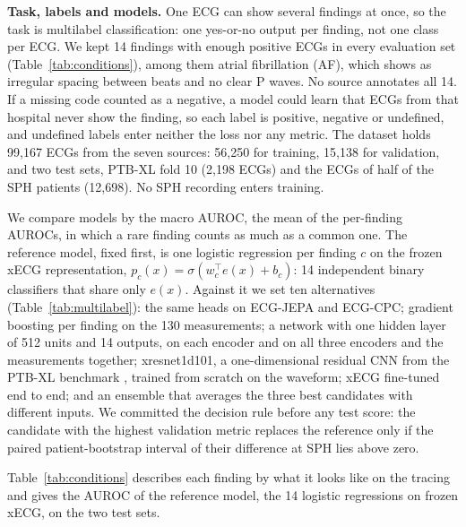 \documentclass[letterpaper,11pt]{article}
\begin{document}
\textbf{Task, labels and models.} One ECG can show several findings at once, so the task is multilabel classification: one yes-or-no output per finding, not one class per ECG. We kept 14 findings with enough positive ECGs in every evaluation set (Table~\ref{tab:conditions}), among them atrial fibrillation (AF), which shows as irregular spacing between beats and no clear P waves. No source annotates all 14. If a missing code counted as a negative, a model could learn that ECGs from that hospital never show the finding, so each label is positive, negative or undefined, and undefined labels enter neither the loss nor any metric. The dataset holds 99,167 ECGs from the seven sources: 56,250 for training, 15,138 for validation, and two test sets, PTB-XL fold 10 (2,198 ECGs) and the ECGs of half of the SPH patients (12,698). No SPH recording enters training.

We compare models by the macro AUROC, the mean of the per-finding AUROCs, in which a rare finding counts as much as a common one. The reference model, fixed first, is one logistic regression per finding $c$ on the frozen xECG representation, $p_c(x) = \sigma(w_c^{\top} e(x) + b_c)$: 14 independent binary classifiers that share only $e(x)$. Against it we set ten alternatives (Table~\ref{tab:multilabel}): the same heads on ECG-JEPA and ECG-CPC; gradient boosting per finding on the 130 measurements; a network with one hidden layer of 512 units and 14 outputs, on each encoder and on all three encoders and the measurements together; xresnet1d101, a one-dimensional residual CNN from the PTB-XL benchmark \parencite{strodthoff2021deep}, trained from scratch on the waveform; xECG fine-tuned end to end; and an ensemble that averages the three best candidates with different inputs. We committed the decision rule before any test score: the candidate with the highest validation metric replaces the reference only if the paired patient-bootstrap interval of their difference at SPH lies above zero.

Table~\ref{tab:conditions} describes each finding by what it looks like on the tracing and gives the AUROC of the reference model, the 14 logistic regressions on frozen xECG, on the two test sets.
\end{document}
